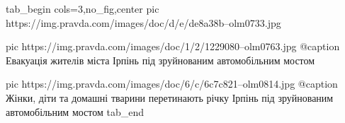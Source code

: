  
 
 
 
 


\ifcmt
  tab_begin cols=3,no_fig,center
     pic https://img.pravda.com/images/doc/d/e/de8a38b--olm0733.jpg

		 pic https://img.pravda.com/images/doc/1/2/1229080--olm0763.jpg
		 @caption Евакуація жителів міста Ірпінь під зруйнованим автомобільним мостом

		 pic https://img.pravda.com/images/doc/6/c/6c7c821--olm0814.jpg
		 @caption Жінки, діти та домашні тварини перетинають річку Ірпінь під зруйнованим автомобільним мостом
  tab_end
\fi
